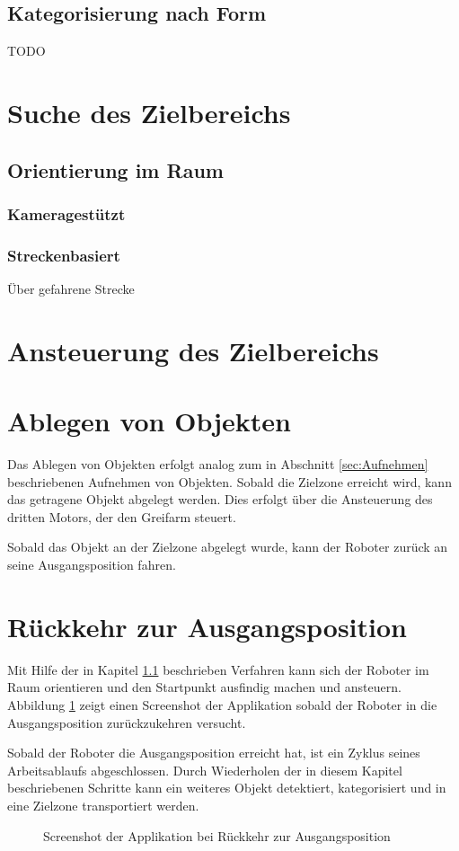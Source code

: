 \subsection{Kategorisierung nach Form}
TODO

\section{Suche des Zielbereichs}
\subsection{Orientierung im Raum}
\label{subsec:Orientierung}
\subsubsection{Kameragestützt}
\subsubsection{Streckenbasiert}
Über gefahrene Strecke

\section{Ansteuerung des Zielbereichs}
\section{Ablegen von Objekten}
Das Ablegen von Objekten erfolgt analog zum in Abschnitt \ref{sec:Aufnehmen} beschriebenen Aufnehmen von Objekten. Sobald die Zielzone erreicht wird, kann das getragene Objekt abgelegt werden. Dies erfolgt über die Ansteuerung des dritten Motors, der den Greifarm steuert. 

Sobald das Objekt an der Zielzone abgelegt wurde, kann der Roboter zurück an seine Ausgangsposition fahren. 

\section{Rückkehr zur Ausgangsposition}

Mit Hilfe der in Kapitel \ref{subsec:Orientierung} beschrieben Verfahren kann sich der Roboter im Raum orientieren und den Startpunkt ausfindig machen und ansteuern. Abbildung \ref{fig:Startpoint} zeigt einen Screenshot der Applikation sobald der Roboter in die Ausgangsposition zurückzukehren versucht. 

Sobald der Roboter die Ausgangsposition erreicht hat, ist ein Zyklus seines Arbeitsablaufs abgeschlossen. Durch Wiederholen der in diesem Kapitel beschriebenen Schritte kann ein weiteres Objekt detektiert, kategorisiert und in eine Zielzone transportiert werden. 

\begin{figure}[h]
\centering
\caption{Screenshot der Applikation bei Rückkehr zur Ausgangsposition}
\label{fig:Startpoint}
\end{figure}
